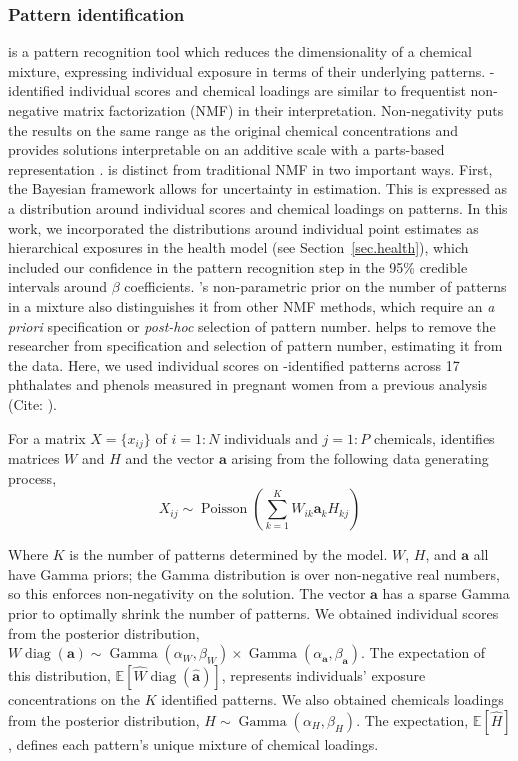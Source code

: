 \subsubsection{Pattern identification}
\label{sec.patterns}
\bnmf is a pattern recognition tool which reduces the dimensionality of a chemical mixture, expressing individual exposure in terms of their underlying patterns. \bnmfc-identified individual scores and chemical loadings are similar to frequentist non-negative matrix factorization (NMF) in their interpretation. Non-negativity puts the results on the same range as the original chemical concentrations and provides solutions interpretable on an additive scale with a parts-based representation \citep{holtzman2018machine, lee1999learning}. \bnmf is distinct from traditional NMF in two important ways. First, the Bayesian framework allows for uncertainty in estimation. This is expressed as a distribution around individual scores and chemical loadings on patterns. In this work, we incorporated the distributions around individual point estimates as hierarchical exposures in the health model (see Section~\ref{sec.health}), which included our confidence in the pattern recognition step in the 95\% credible intervals around $\beta$ coefficients. \bnmfc's non-parametric prior on the number of patterns in a mixture also distinguishes it from other NMF methods, which require an \textit{a priori} specification or \textit{post-hoc} selection of pattern number. \bnmf helps to remove the researcher from specification and selection of pattern number, estimating it from the data. Here, we used individual scores on \bnmfc-identified patterns across 17 phthalates and phenols measured in pregnant women from a previous analysis (Cite: \bnmfc).

For a matrix $X =\lbrace x_{i j}\rbrace $ of $i = 1:N$ individuals and $j = 1:P$ chemicals, \bnmf identifies matrices $W$ and $H$ and the vector $\mathbf{a}$ arising from the following data generating process,
\begin{equation}
\label{nmf}
X_{i j} \sim \operatorname{Poisson}\left(\sum^K_{k=1} W_{i k} \mathbf{a}_k H_{k j}\right)
\end{equation}

Where $K$ is the number of patterns determined by the model. $W$, $H$, and $\mathbf{a}$ all have Gamma priors; the Gamma distribution is over non-negative real numbers, so this enforces non-negativity on the solution. The vector $\mathbf{a}$ has a sparse Gamma prior to optimally shrink the number of patterns. We obtained individual scores from the posterior distribution, ${W\operatorname{diag}(\mathbf{a}) \sim \operatorname{Gamma}(\alpha_W, \beta_W)} \times
\operatorname{Gamma}(\alpha_\mathbf{a}, \beta_\mathbf{a})$. The expectation of this distribution, $\mathbb{E}[\widehat{W}\operatorname{diag}(\widehat{\mathbf{a}})]$, represents individuals' exposure concentrations on the $K$ identified patterns. We also obtained chemicals loadings from the posterior distribution, $H \sim \operatorname{Gamma}(\alpha_H, \beta_H)$. The expectation, $\mathbb{E}[\widehat{H}]$, defines each pattern's unique mixture of chemical loadings.

